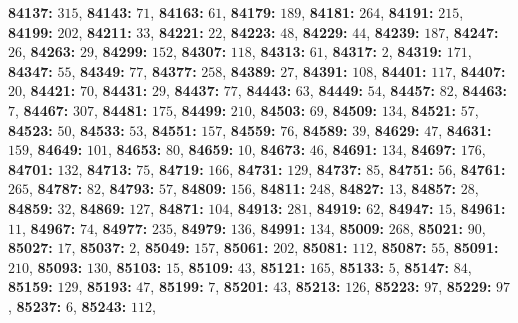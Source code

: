 \textsf{\bfseries 84137:} $315$, \textsf{\bfseries 84143:} $71$, \textsf{\bfseries 84163:} $61$, \textsf{\bfseries 84179:} $189$, \textsf{\bfseries 84181:} $264$, \textsf{\bfseries 84191:} $215$, \textsf{\bfseries 84199:} $202$, \textsf{\bfseries 84211:} $33$, \textsf{\bfseries 84221:} $22$, \textsf{\bfseries 84223:} $48$, \textsf{\bfseries 84229:} $44$, \textsf{\bfseries 84239:} $187$, \textsf{\bfseries 84247:} $26$, \textsf{\bfseries 84263:} $29$, \textsf{\bfseries 84299:} $152$, \textsf{\bfseries 84307:} $118$, \textsf{\bfseries 84313:} $61$, \textsf{\bfseries 84317:} $2$, \textsf{\bfseries 84319:} $171$, \textsf{\bfseries 84347:} $55$, \textsf{\bfseries 84349:} $77$, \textsf{\bfseries 84377:} $258$, \textsf{\bfseries 84389:} $27$, \textsf{\bfseries 84391:} $108$, \textsf{\bfseries 84401:} $117$, \textsf{\bfseries 84407:} $20$, \textsf{\bfseries 84421:} $70$, \textsf{\bfseries 84431:} $29$, \textsf{\bfseries 84437:} $77$, \textsf{\bfseries 84443:} $63$, \textsf{\bfseries 84449:} $54$, \textsf{\bfseries 84457:} $82$, \textsf{\bfseries 84463:} $7$, \textsf{\bfseries 84467:} $307$, \textsf{\bfseries 84481:} $175$, \textsf{\bfseries 84499:} $210$, \textsf{\bfseries 84503:} $69$, \textsf{\bfseries 84509:} $134$, \textsf{\bfseries 84521:} $57$, \textsf{\bfseries 84523:} $50$, \textsf{\bfseries 84533:} $53$, \textsf{\bfseries 84551:} $157$, \textsf{\bfseries 84559:} $76$, \textsf{\bfseries 84589:} $39$, \textsf{\bfseries 84629:} $47$, \textsf{\bfseries 84631:} $159$, \textsf{\bfseries 84649:} $101$, \textsf{\bfseries 84653:} $80$, \textsf{\bfseries 84659:} $10$, \textsf{\bfseries 84673:} $46$, \textsf{\bfseries 84691:} $134$, \textsf{\bfseries 84697:} $176$, \textsf{\bfseries 84701:} $132$, \textsf{\bfseries 84713:} $75$, \textsf{\bfseries 84719:} $166$, \textsf{\bfseries 84731:} $129$, \textsf{\bfseries 84737:} $85$, \textsf{\bfseries 84751:} $56$, \textsf{\bfseries 84761:} $265$, \textsf{\bfseries 84787:} $82$, \textsf{\bfseries 84793:} $57$, \textsf{\bfseries 84809:} $156$, \textsf{\bfseries 84811:} $248$, \textsf{\bfseries 84827:} $13$, \textsf{\bfseries 84857:} $28$, \textsf{\bfseries 84859:} $32$, \textsf{\bfseries 84869:} $127$, \textsf{\bfseries 84871:} $104$, \textsf{\bfseries 84913:} $281$, \textsf{\bfseries 84919:} $62$, \textsf{\bfseries 84947:} $15$, \textsf{\bfseries 84961:} $11$, \textsf{\bfseries 84967:} $74$, \textsf{\bfseries 84977:} $235$, \textsf{\bfseries 84979:} $136$, \textsf{\bfseries 84991:} $134$, \textsf{\bfseries 85009:} $268$, \textsf{\bfseries 85021:} $90$, \textsf{\bfseries 85027:} $17$, \textsf{\bfseries 85037:} $2$, \textsf{\bfseries 85049:} $157$, \textsf{\bfseries 85061:} $202$, \textsf{\bfseries 85081:} $112$, \textsf{\bfseries 85087:} $55$, \textsf{\bfseries 85091:} $210$, \textsf{\bfseries 85093:} $130$, \textsf{\bfseries 85103:} $15$, \textsf{\bfseries 85109:} $43$, \textsf{\bfseries 85121:} $165$, \textsf{\bfseries 85133:} $5$, \textsf{\bfseries 85147:} $84$, \textsf{\bfseries 85159:} $129$, \textsf{\bfseries 85193:} $47$, \textsf{\bfseries 85199:} $7$, \textsf{\bfseries 85201:} $43$, \textsf{\bfseries 85213:} $126$, \textsf{\bfseries 85223:} $97$, \textsf{\bfseries 85229:} $97$, \textsf{\bfseries 85237:} $6$, \textsf{\bfseries 85243:} $112$, 
